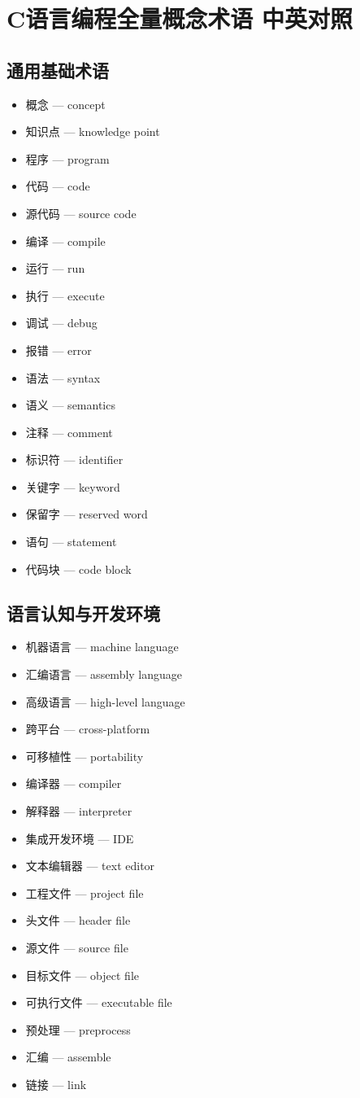 
\section{C语言编程全量概念术语 中英对照}

\subsection{通用基础术语}
\begin{itemize}
\item 概念 — concept
\item 知识点 — knowledge point
\item 程序 — program
\item 代码 — code
\item 源代码 — source code
\item 编译 — compile
\item 运行 — run
\item 执行 — execute
\item 调试 — debug
\item 报错 — error
\item 语法 — syntax
\item 语义 — semantics
\item 注释 — comment
\item 标识符 — identifier
\item 关键字 — keyword
\item 保留字 — reserved word
\item 语句 — statement
\item 代码块 — code block
\end{itemize}

\subsection{语言认知与开发环境}
\begin{itemize}
\item 机器语言 — machine language
\item 汇编语言 — assembly language
\item 高级语言 — high-level language
\item 跨平台 — cross-platform
\item 可移植性 — portability
\item 编译器 — compiler
\item 解释器 — interpreter
\item 集成开发环境 — IDE
\item 文本编辑器 — text editor
\item 工程文件 — project file
\item 头文件 — header file
\item 源文件 — source file
\item 目标文件 — object file
\item 可执行文件 — executable file
\item 预处理 — preprocess
\item 汇编 — assemble
\item 链接 — link
\end{itemize}

